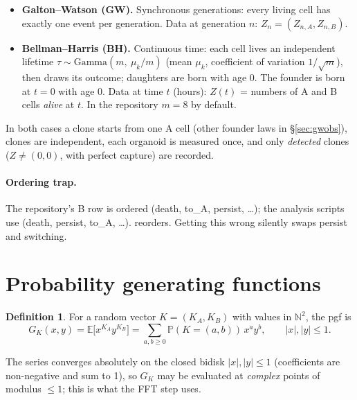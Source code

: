 \documentclass[11pt]{article}
\theoremstyle{definition}
\newtheorem{definition}[theorem]{Definition}
\theoremstyle{remark}
\newcommand{\E}{\mathbb{E}}
\newcommand{\Prob}{\mathbb{P}}
\newcommand{\code}[1]{\texttt{\detokenize{#1}}}
\begin{document}
\begin{itemize}
\item \textbf{Galton--Watson (GW).} Synchronous generations: every living cell has exactly one event per generation. Data at generation $n$: $Z_n=(Z_{n,A},Z_{n,B})$.
\item \textbf{Bellman--Harris (BH).} Continuous time: each cell lives an independent lifetime $\tau\sim\mathrm{Gamma}(m,\ \mu_k/m)$ (mean $\mu_k$, coefficient of variation $1/\sqrt m$), then draws its outcome; daughters are born with age 0. The founder is born at $t=0$ with age 0. Data at time $t$ (hours): $Z(t)$ = numbers of A and B cells \emph{alive} at $t$. In the repository $m=8$ by default.
\end{itemize}
In both cases a clone starts from one A cell (other founder laws in \S\ref{sec:gwobs}), clones are independent, each organoid is measured once, and only \emph{detected} clones ($Z\neq(0,0)$, with perfect capture) are recorded.

\paragraph{Ordering trap.} The repository's B row is ordered (death, to\_A, persist, \dots); the analysis scripts use (death, persist, to\_A, \dots). \code{bhexact.from_repo} reorders. Getting this wrong silently swaps persist and switching.

\section{Probability generating functions}\label{sec:pgf}
\begin{definition}
For a random vector $K=(K_A,K_B)$ with values in $\mathbb N^2$, the pgf is
\[
G_K(x,y)=\E\big[x^{K_A}y^{K_B}\big]=\sum_{a,b\ge0}\Prob(K=(a,b))\,x^ay^b,\qquad |x|,|y|\le1 .
\]
\end{definition}
The series converges absolutely on the closed bidisk $|x|,|y|\le1$ (coefficients are non-negative and sum to 1), so $G_K$ may be evaluated at \emph{complex} points of modulus $\le1$; this is what the FFT step uses.
\end{document}
